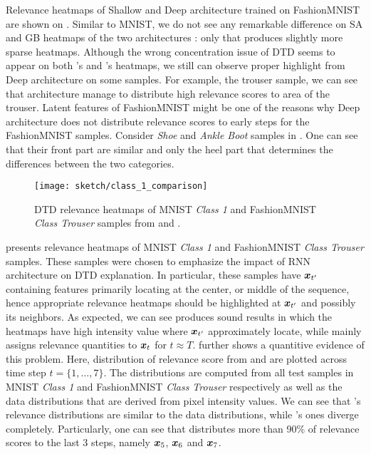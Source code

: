 Relevance heatmaps of Shallow and Deep architecture trained on  FashionMNIST  are shown on \addfigure{\ref{fig:fashion_mnist_experiment}}. Similar to MNIST, we do not see any remarkable difference on SA and GB heatmaps of the two architectures : only that  produces slightly more sparse heatmaps. Although the wrong concentration issue of DTD  seems to appear on both 's and 's heatmaps, we still can observe proper highlight from Deep architecture on some samples. For example, the trouser sample, we can see  that  architecture manage to distribute high relevance scores to area of the trouser. Latent features of FashionMNIST  might be one of the reasons why Deep architecture does not distribute relevance scores to early steps for the FashionMNIST samples. Consider \textit{Shoe} and \textit{Ankle Boot} samples in \addfigure{\ref{fig:fashion_mnist_samples}}. One can see that  their front part are similar and only the heel part that determines the differences between the two categories.




 \begin{figure}[ht!]
\centering
\texttt{[image: sketch/class\_1\_comparison]}
\caption{DTD relevance heatmaps of MNIST \textit{Class 1} and FashionMNIST \textit{Class Trouser} samples from  and . }
\label{fig:class_1_comparison}
\end{figure}

\addfigure{\ref{fig:class_1_comparison}} presents relevance heatmaps of MNIST \textit{Class 1} and FashionMNIST \textit{Class Trouser} samples. These samples were chosen to emphasize the impact of RNN architecture on DTD explanation. In particular,  these samples have $\boldsymbol{x}_{t'}$ containing features  primarily locating at the center, or middle of the sequence, hence appropriate relevance heatmaps should be highlighted at $\boldsymbol{x}_{t'}$ and possibly its neighbors.  As expected, we can see  produces sound results in which the  heatmaps have high intensity value where $\boldsymbol{x}_{t'}$ approximately locate, while  mainly assigns relevance quantities to $\boldsymbol{x}_{t}$ for $t \approx T$. \addfigure{\ref{fig:exp1_dist_plot}} further shows a quantitive evidence of this problem. Here, distribution of relevance score from  and  are plotted across time step $t = \{ 1, \dots, 7 \}$. The distributions are computed from all test samples in MNIST \textit{Class 1} and FashionMNIST \textit{Class Trouser} respectively as well as the data distributions that are derived from pixel intensity values.  We can see that 's relevance distributions are similar to the data distributions, while  's ones diverge completely. Particularly,  one can see that  distributes more than 90\% of relevance scores to the last 3 steps, namely $\boldsymbol{x}_5$, $\boldsymbol{x}_6$ and $\boldsymbol{x}_7$.


